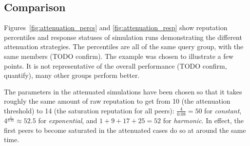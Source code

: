 \subsection{Comparison}
Figures~\ref{fig:attenuation_percs} and \ref{fig:attenuation_resp} show
reputation percentiles and response statuses of simulation runs demonstrating
the different attenuation strategies. The percentiles are all of the same query
group, with the same members (TODO confirm). The example was chosen to
illustrate a few points. It is not representative of the overall performance
(TODO confirm, quantify), many other groups perform better.

The parameters in the attenuated simulations have been chosen so that it takes
roughly the same amount of raw reputation to get from 10 (the attenuation
threshold) to 14 (the saturation reputation for all peers): $\frac{4}{0.08} =
50$ for \emph{constant}, $4^{\frac{1}{0.35}} \approx 52.5$ for
\emph{exponential}, and $1 + 9 + 17 + 25 = 52$ for \emph{harmonic}. In effect,
the first peers to become saturated in the attenuated cases do so at around the
same time.

